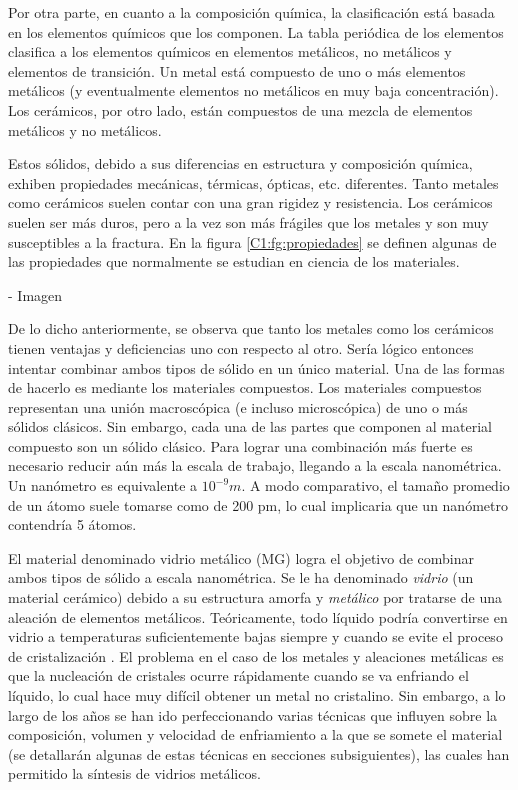 Por otra parte, en cuanto a la composición química, la clasificación está basada en los elementos químicos que los componen. La tabla periódica de los elementos clasifica a los elementos químicos en elementos metálicos, no metálicos y elementos de transición. Un metal está compuesto de uno o más elementos metálicos (y eventualmente elementos no metálicos en muy baja concentración). Los cerámicos, por otro lado, están compuestos de una mezcla de elementos metálicos y no metálicos. 

Estos sólidos, debido a sus diferencias en estructura y composición química, exhiben propiedades mecánicas, térmicas, ópticas, etc. diferentes. Tanto metales como cerámicos suelen contar con una gran rigidez y resistencia. Los cerámicos suelen ser más duros, pero a la vez son más frágiles que los metales y son muy susceptibles a la fractura. En la figura \ref{C1:fg:propiedades} se definen algunas de las propiedades que normalmente se estudian en ciencia de los materiales.

- Imagen

De lo dicho anteriormente, se observa que tanto los metales como los cerámicos tienen ventajas y deficiencias uno con respecto al otro. Sería lógico entonces intentar combinar ambos tipos de sólido en un único material. Una de las formas de hacerlo es mediante los materiales compuestos. Los materiales compuestos representan una unión macroscópica (e incluso microscópica) de uno o más sólidos clásicos. Sin embargo, cada una de las partes que componen al material compuesto son un sólido clásico. Para lograr una combinación más fuerte es necesario reducir aún más la escala de trabajo, llegando a la escala nanométrica. Un nanómetro es equivalente a $10^{-9} m$. A modo comparativo, el tamaño promedio de un átomo suele tomarse como de 200 pm, lo cual implicaria que un nanómetro contendría 5 átomos.

El material denominado vidrio metálico (MG) logra el objetivo de combinar ambos tipos de sólido a escala nanométrica. Se le ha denominado \textit{vidrio} (un material cerámico) debido a su estructura amorfa y \textit{metálico} por tratarse de una aleación de elementos metálicos. Teóricamente, todo líquido podría convertirse en vidrio a temperaturas suficientemente bajas siempre y cuando se evite el proceso de cristalización \citep{turnbull61}. El problema en el caso de los metales y aleaciones metálicas es que la nucleación de cristales ocurre rápidamente cuando se va enfriando el líquido, lo cual hace muy difícil obtener un metal no cristalino. Sin embargo, a lo largo de los años se han ido perfeccionando varias técnicas que influyen sobre la composición, volumen y velocidad de enfriamiento a la que se somete el material (se detallarán algunas de estas técnicas en secciones subsiguientes), las cuales han permitido la síntesis de vidrios metálicos.

